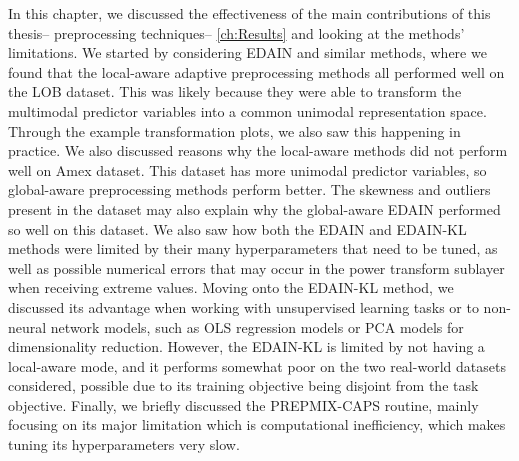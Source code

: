 \documentclass{statsmsc}
\begin{document}
{In this chapter, we discussed the effectiveness of the main contributions of
this thesis--%
preprocessing techniques--%
\cref{ch:Results} and looking at the methods' limitations.  We started by
considering \ac{EDAIN} and similar methods, where we found that the local-aware
adaptive preprocessing methods all performed well on the \ac{LOB} dataset. This
was likely because they were able to transform the multimodal predictor
variables into a common unimodal representation space. Through the example
transformation plots, we also saw this happening in practice.  We also
discussed reasons why the local-aware methods did not perform well on Amex
dataset. This dataset has more unimodal predictor variables, so global-aware
preprocessing methods perform better.  The skewness and outliers present in the
dataset may also explain why the global-aware \ac{EDAIN} performed so well on
this dataset.  We also saw how both the \ac{EDAIN} and \ac{EDAIN-KL} methods
were limited by their many hyperparameters that need to be tuned, as well as
possible numerical errors that may occur in the power transform sublayer when
receiving extreme values.  Moving onto the \ac{EDAIN-KL} method, we discussed
its advantage when working with unsupervised learning tasks or to non-neural
network models, such as \ac{OLS} regression models or \ac{PCA} models for
dimensionality reduction. However, the \ac{EDAIN-KL} is limited by not having a
local-aware mode, and it performs somewhat poor on the two real-world datasets
considered, possible due to its training objective being disjoint from the task
objective.  Finally, we briefly discussed the \ac{PREPMIX-CAPS} routine, mainly
focusing on its major limitation which is computational inefficiency, which
makes tuning its hyperparameters very slow.






}
\end{document}
